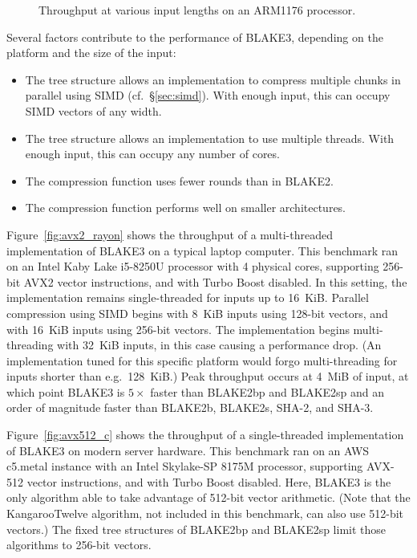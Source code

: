 \documentclass[11pt,notitlepage,a4paper]{article}
\begin{document}
\begin{figure}[h]
\centering
%

\caption{Throughput at various input lengths on an ARM1176 processor.}%
\label{fig:rpizero}
\end{figure}

Several factors contribute to the performance of BLAKE3, depending on the
platform and the size of the input:

\begin{itemize}
    \item The tree structure allows an implementation to compress multiple
        chunks in parallel using SIMD (cf.~\S\ref{sec:simd}). With enough
        input, this can occupy SIMD vectors of any width.
    \item The tree structure allows an implementation to use multiple threads.
        With enough input, this can occupy any number of cores.
    \item The compression function uses fewer rounds than in BLAKE2.
    \item The compression function performs well on smaller architectures.
\end{itemize}

Figure~\ref{fig:avx2_rayon} shows the throughput of a multi-threaded
implementation of BLAKE3 on a typical laptop computer. This benchmark ran on an
Intel Kaby Lake i5-8250U processor with 4 physical cores, supporting 256-bit
AVX2 vector instructions, and with Turbo Boost disabled. In this setting, the
implementation remains single-threaded for inputs up to 16~KiB. Parallel
compression using SIMD begins with 8~KiB inputs using 128-bit vectors, and with
16~KiB inputs using 256-bit vectors. The implementation begins multi-threading
with 32~KiB inputs, in this case causing a performance drop. (An implementation
tuned for this specific platform would forgo multi-threading for inputs shorter
than e.g.\ 128~KiB.) Peak throughput occurs at 4~MiB of input, at which point
BLAKE3 is $5\times$ faster than BLAKE2bp and BLAKE2sp and an order of magnitude
faster than BLAKE2b, BLAKE2s, SHA-2, and SHA-3.

Figure~\ref{fig:avx512_c} shows the throughput of a single-threaded
implementation of BLAKE3 on modern server hardware. This benchmark ran on an
AWS c5.metal instance with an Intel Skylake-SP 8175M processor, supporting
AVX-512 vector instructions, and with Turbo Boost disabled. Here, BLAKE3 is the
only algorithm able to take advantage of 512-bit vector arithmetic. (Note that
the KangarooTwelve algorithm, not included in this benchmark, can also use
512-bit vectors.) The fixed tree structures of BLAKE2bp and BLAKE2sp limit
those algorithms to 256-bit vectors.
\end{document}
